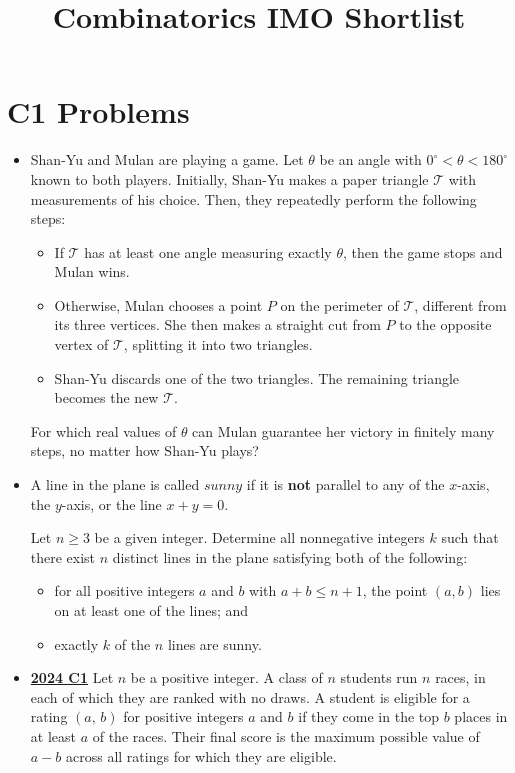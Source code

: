 \documentclass[11pt]{scrartcl}
\begin{document}
\newpage
\title{Combinatorics IMO Shortlist}

\section*{C1 Problems} \label{C1}
\begin{itemize}[leftmargin=*]


\item {} Shan-Yu and Mulan are playing a game. Let $\theta$ be an angle with $0^\circ<\theta<180^\circ$ known to both players. Initially, Shan-Yu makes a paper triangle $\mathcal{T}$ with measurements of his choice. Then, they repeatedly perform the following steps:
\begin{itemize}[leftmargin=*]
\item[$\bullet$] If $\mathcal{T}$ has at least one angle measuring exactly $\theta$, then the game stops and Mulan wins.
\item[$\bullet$] Otherwise, Mulan chooses a point $P$ on the perimeter of $\mathcal{T}$, different from its three vertices. She then makes a straight cut from $P$ to the opposite vertex of $\mathcal{T}$, splitting it into two triangles.
\item[$\bullet$] Shan-Yu discards one of the two triangles. The remaining triangle becomes the new $\mathcal{T}$.
\end{itemize}
For which real values of $\theta$ can Mulan guarantee her victory in finitely many steps, no matter how Shan-Yu plays?

\item {} A line in the plane is called $sunny$ if it is \textbf{not} parallel to any of the $x$-axis, the $y$-axis, or the line $x+y=0$.

Let $n\geqslant  3$ be a given integer. Determine all nonnegative integers $k$ such that there exist $n$ distinct lines in the plane satisfying both of the following:
\begin{itemize}[leftmargin=*]
\item[$\bullet$]  for all positive integers $a$ and $b$ with $a+b\leqslant n+1$, the point $(a,b)$ lies on at least one of the lines; and
\item[$\bullet$] exactly $k$ of the $n$ lines are sunny.
\end{itemize}
\item \href{https://artofproblemsolving.com/community/c6h3610442p35340913}{\textbf{2024 C1}} Let $n$ be a positive integer. A class of $n$ students run $n$ races, in each of which they are ranked with no draws. A student is eligible for a rating $(a,\,b)$ for positive integers $a$ and $b$ if they come in the top $b$ places in at least $a$ of the races. Their final score is the maximum possible value of $a-b$ across all ratings for which they are eligible.


\end{itemize}
\end{document}
